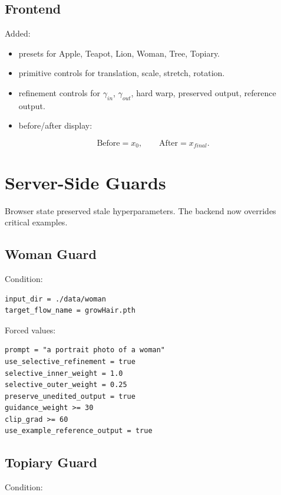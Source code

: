 \documentclass[11pt,a4paper]{article}
\begin{document}
\subsection{Frontend}

Added:

\begin{itemize}
  \item presets for Apple, Teapot, Lion, Woman, Tree, Topiary.
  \item primitive controls for translation, scale, stretch, rotation.
  \item refinement controls for \(\gamma_{in}\), \(\gamma_{out}\), hard warp, preserved output, reference output.
  \item before/after display:
\end{itemize}

\begin{equation}
\text{Before}=x_0,\qquad
\text{After}=x_{final}.
\end{equation}

\section{Server-Side Guards}

Browser state preserved stale hyperparameters. The backend now overrides critical examples.

\subsection{Woman Guard}

Condition:

\begin{verbatim}
input_dir = ./data/woman
target_flow_name = growHair.pth
\end{verbatim}

Forced values:

\begin{verbatim}
prompt = "a portrait photo of a woman"
use_selective_refinement = true
selective_inner_weight = 1.0
selective_outer_weight = 0.25
preserve_unedited_output = true
guidance_weight >= 30
clip_grad >= 60
use_example_reference_output = true
\end{verbatim}

\subsection{Topiary Guard}

Condition:
\end{document}
